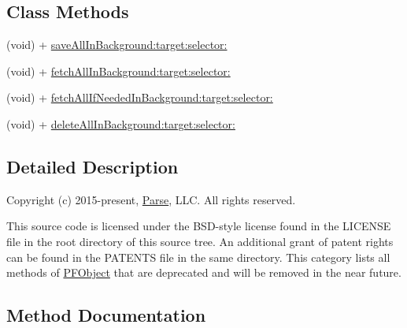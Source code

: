 \subsection*{Class Methods}
\begin{DoxyCompactItemize}
\item 
(void) + \hyperlink{category_p_f_object_07_deprecated_08_aa1fba48cec5bba80c72e6af4d8d88717}{save\+All\+In\+Background\+:target\+:selector\+:}
\begin{DoxyCompactList}\small\item\em 

 \end{DoxyCompactList}\item 
(void) + \hyperlink{category_p_f_object_07_deprecated_08_ad503445a923bc28ce86b3540e99ad290}{fetch\+All\+In\+Background\+:target\+:selector\+:}
\begin{DoxyCompactList}\small\item\em 

 \end{DoxyCompactList}\item 
(void) + \hyperlink{category_p_f_object_07_deprecated_08_aa783e119f260f5e8598abb0564359318}{fetch\+All\+If\+Needed\+In\+Background\+:target\+:selector\+:}
\item 
(void) + \hyperlink{category_p_f_object_07_deprecated_08_a312996cea1a17a6f4bbdfde07f4891a1}{delete\+All\+In\+Background\+:target\+:selector\+:}
\begin{DoxyCompactList}\small\item\em 

 \end{DoxyCompactList}\end{DoxyCompactItemize}


\subsection{Detailed Description}
Copyright (c) 2015-\/present, \hyperlink{interface_parse}{Parse}, L\+L\+C. All rights reserved.

This source code is licensed under the B\+S\+D-\/style license found in the L\+I\+C\+E\+N\+S\+E file in the root directory of this source tree. An additional grant of patent rights can be found in the P\+A\+T\+E\+N\+T\+S file in the same directory. This category lists all methods of {\ttfamily \hyperlink{interface_p_f_object}{P\+F\+Object}} that are deprecated and will be removed in the near future. 

\subsection{Method Documentation}
\hypertarget{category_p_f_object_07_deprecated_08_a312996cea1a17a6f4bbdfde07f4891a1}{}
